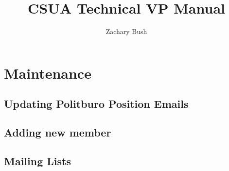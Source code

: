 \documentclass[letterpaper]{book}
\title{CSUA Technical VP Manual}
\author{Zachary Bush}
\begin{document}
\maketitle
\tableofcontents
\chapter{Maintenance}
\section{Updating Politburo Position Emails}
\section{Adding new member}
\section{Mailing Lists}
\end{document}
